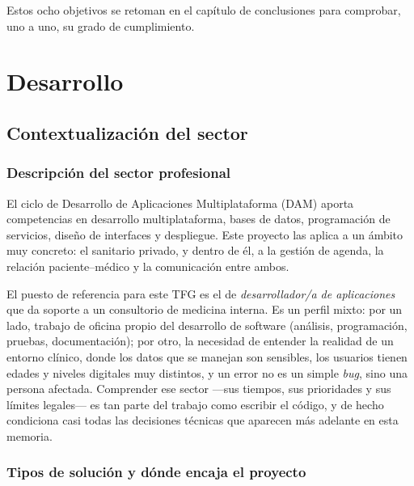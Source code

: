 \documentclass[12pt,a4paper]{report}
\begin{document}
Estos ocho objetivos se retoman en el capítulo de conclusiones para comprobar, uno a uno, su grado de cumplimiento.

\chapter{Desarrollo}

\section{Contextualización del sector}

\subsection{Descripción del sector profesional}

El ciclo de Desarrollo de Aplicaciones Multiplataforma (DAM) aporta competencias en desarrollo multiplataforma, bases de datos, programación de servicios, diseño de interfaces y despliegue. Este proyecto las aplica a un ámbito muy concreto: el sanitario privado, y dentro de él, a la gestión de agenda, la relación paciente--médico y la comunicación entre ambos.

El puesto de referencia para este TFG es el de \emph{desarrollador/a de aplicaciones} que da soporte a un consultorio de medicina interna. Es un perfil mixto: por un lado, trabajo de oficina propio del desarrollo de software (análisis, programación, pruebas, documentación); por otro, la necesidad de entender la realidad de un entorno clínico, donde los datos que se manejan son sensibles, los usuarios tienen edades y niveles digitales muy distintos, y un error no es un simple \emph{bug}, sino una persona afectada. Comprender ese sector —sus tiempos, sus prioridades y sus límites legales— es tan parte del trabajo como escribir el código, y de hecho condiciona casi todas las decisiones técnicas que aparecen más adelante en esta memoria.

\subsection{Tipos de solución y dónde encaja el proyecto}
\end{document}
